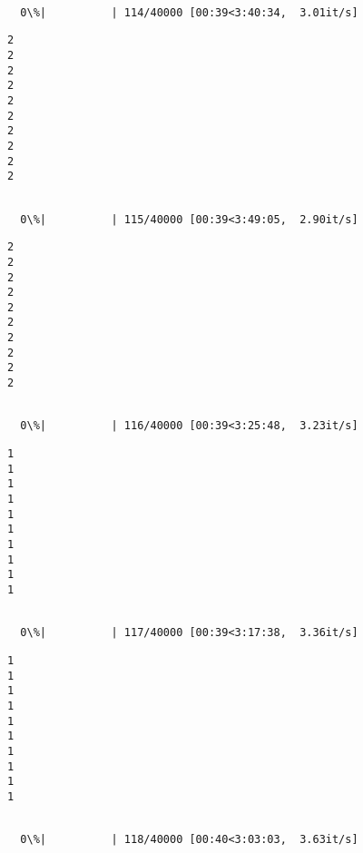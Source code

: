 \documentclass[11pt]{article}
\begin{document}
    \begin{Verbatim}[commandchars=\\\{\}]

  0\%|          | 114/40000 [00:39<3:40:34,  3.01it/s]
    \end{Verbatim}

    \begin{Verbatim}[commandchars=\\\{\}]
2
2
2
2
2
2
2
2
2
2

    \end{Verbatim}

    \begin{Verbatim}[commandchars=\\\{\}]

  0\%|          | 115/40000 [00:39<3:49:05,  2.90it/s]
    \end{Verbatim}

    \begin{Verbatim}[commandchars=\\\{\}]
2
2
2
2
2
2
2
2
2
2

    \end{Verbatim}

    \begin{Verbatim}[commandchars=\\\{\}]

  0\%|          | 116/40000 [00:39<3:25:48,  3.23it/s]
    \end{Verbatim}

    \begin{Verbatim}[commandchars=\\\{\}]
1
1
1
1
1
1
1
1
1
1

    \end{Verbatim}

    \begin{Verbatim}[commandchars=\\\{\}]

  0\%|          | 117/40000 [00:39<3:17:38,  3.36it/s]
    \end{Verbatim}

    \begin{Verbatim}[commandchars=\\\{\}]
1
1
1
1
1
1
1
1
1
1

    \end{Verbatim}

    \begin{Verbatim}[commandchars=\\\{\}]

  0\%|          | 118/40000 [00:40<3:03:03,  3.63it/s]
    \end{Verbatim}
\end{document}
